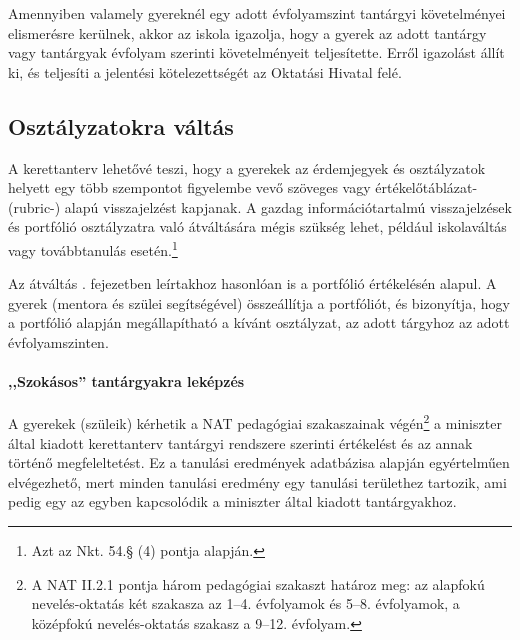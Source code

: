 Amennyiben valamely gyereknél egy adott évfolyamszint tantárgyi követelményei
elismerésre kerülnek, akkor az iskola igazolja, hogy a gyerek az adott tantárgy
vagy tantárgyak évfolyam szerinti követelményeit teljesítette.
Erről igazolást állít ki, és teljesíti a jelentési kötelezettségét az Oktatási
Hivatal felé.

\subsection{Osztályzatokra váltás}
\label{sec:osztalyzatok}
A kerettanterv lehetővé teszi, hogy a gyerekek az érdemjegyek
és osztályzatok
helyett egy több szempontot figyelembe vevő szöveges vagy értékelőtáblázat-
(rubric-) alapú visszajelzést kapjanak.
A gazdag információtartalmú visszajelzések és portfólió osztályzatra való
átváltására mégis szükség lehet, például iskolaváltás vagy továbbtanulás
esetén.\footnote{Azt az Nkt. 54.§ (4) pontja alapján.}

Az átváltás .
fejezetben leírtakhoz
hasonlóan is a portfólió értékelésén alapul.
A gyerek (mentora és szülei segítségével) összeállítja a portfóliót, és
bizonyítja, hogy a portfólió alapján megállapítható a kívánt osztályzat, az
adott tárgyhoz az adott évfolyamszinten.

\paragraph{,,Szokásos'' tantárgyakra leképzés}
A gyerekek (szüleik) kérhetik a NAT pedagógiai szakaszainak
végén\footnote{A NAT II.2.1 pontja három pedagógiai szakaszt határoz meg: az
      alapfokú nevelés-oktatás két szakasza az 1--4. évfolyamok és 5--8.
      évfolyamok,
      a középfokú nevelés-oktatás szakasz a 9--12. évfolyam.}
a miniszter
által kiadott kerettanterv tantárgyi rendszere szerinti értékelést és az annak
történő megfeleltetést. Ez a tanulási eredmények adatbázisa alapján
egyértelműen elvégezhető, mert minden tanulási eredmény egy tanulási területhez
tartozik, ami pedig egy az egyben kapcsolódik a miniszter által kiadott
tantárgyakhoz.
